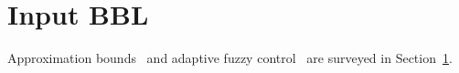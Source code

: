 \documentclass{article}
\begin{document}
\section{Input BBL}\label{sec:bbl_in}
Approximation bounds~\citep{Barron1993, Candes1998} and adaptive fuzzy control~\citet{Skrjanc2019, Sonoda2021a} are surveyed in Section~\ref{sec:bbl_in}.


\end{document}
